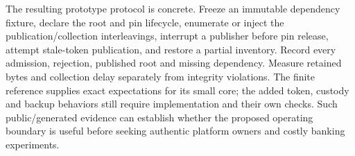 The resulting prototype protocol is concrete. Freeze an immutable dependency fixture, declare the root and pin lifecycle, enumerate or inject the publication/collection interleavings, interrupt a publisher before pin release, attempt stale-token publication, and restore a partial inventory. Record every admission, rejection, published root and missing dependency. Measure retained bytes and collection delay separately from integrity violations. The finite reference supplies exact expectations for its small core; the added token, custody and backup behaviors still require implementation and their own checks. Such public/generated evidence can establish whether the proposed operating boundary is useful before seeking authentic platform owners and costly banking experiments.
\label{exec17:i4-pins-end}
